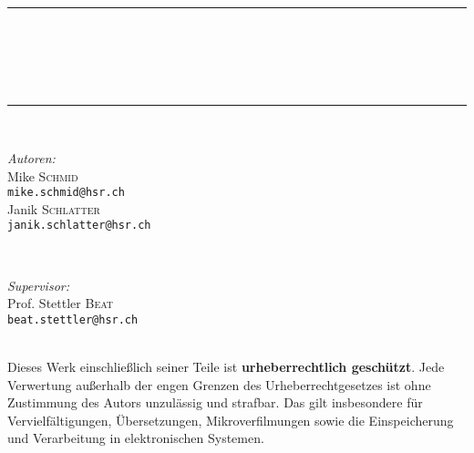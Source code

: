 \begin{titlepage}
    \begin{center}
        
        \rule{\linewidth}{0.5mm}\\[2ex]
        {\huge \bfseries  \titel }\\[2ex]
        {\LARGE \untertitel }\\[2ex]
        {\large \datum}\\
        \rule{\linewidth}{0.5mm}\\[10ex]

        \begin{minipage}[t]{0.4\textwidth}
            \begin{flushleft} 
                \large \emph{Autoren:}\\
                    \large Mike \textsc{Schmid}\\
                    \scriptsize \texttt{mike.schmid@hsr.ch}\\[1ex]
                    \large Janik \textsc{Schlatter}\\
                    \scriptsize \texttt{janik.schlatter@hsr.ch}\\[1ex]
            \end{flushleft}
            \end{minipage}
            ~
            \begin{minipage}[t]{0.4\textwidth}
            \begin{flushright} 
                \large \emph{Supervisor:} \\
                Prof. Stettler \textsc{Beat}\\
                \scriptsize \texttt{beat.stettler@hsr.ch}\\[1ex]
            \end{flushright}
        \end{minipage}\\[40ex]

        \small
        \noindent
        Dieses Werk einschließlich seiner Teile ist \textbf{urheberrechtlich geschützt}.
        Jede Verwertung außerhalb der engen Grenzen des Urheberrechtgesetzes ist ohne
        Zustimmung des Autors unzulässig und strafbar. Das gilt insbesondere für
        Vervielfältigungen, Übersetzungen, Mikroverfilmungen sowie die Einspeicherung
        und Verarbeitung in elektronischen Systemen.

    \end{center}
\end{titlepage}